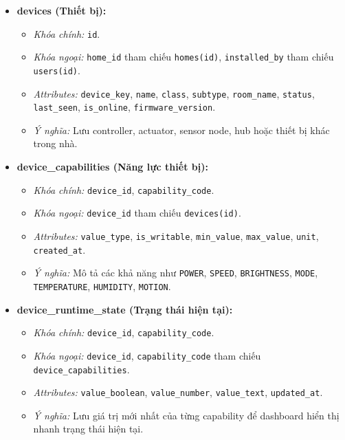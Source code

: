 \begin{itemize}
    \item \textbf{devices (Thiết bị):}
    \begin{itemize}
        \item \textit{Khóa chính:} \texttt{id}.
        \item \textit{Khóa ngoại:} \texttt{home\_id} tham chiếu \texttt{homes(id)}, \texttt{installed\_by} tham chiếu \texttt{users(id)}.
        \item \textit{Attributes:} \texttt{device\_key}, \texttt{name}, \texttt{class}, \texttt{subtype}, \texttt{room\_name}, \texttt{status}, \texttt{last\_seen}, \texttt{is\_online}, \texttt{firmware\_version}.
        \item \textit{Ý nghĩa:} Lưu controller, actuator, sensor node, hub hoặc thiết bị khác trong nhà.
    \end{itemize}

    \item \textbf{device\_capabilities (Năng lực thiết bị):}
    \begin{itemize}
        \item \textit{Khóa chính:} \texttt{device\_id}, \texttt{capability\_code}.
        \item \textit{Khóa ngoại:} \texttt{device\_id} tham chiếu \texttt{devices(id)}.
        \item \textit{Attributes:} \texttt{value\_type}, \texttt{is\_writable}, \texttt{min\_value}, \texttt{max\_value}, \texttt{unit}, \texttt{created\_at}.
        \item \textit{Ý nghĩa:} Mô tả các khả năng như \texttt{POWER}, \texttt{SPEED}, \texttt{BRIGHTNESS}, \texttt{MODE}, \texttt{TEMPERATURE}, \texttt{HUMIDITY}, \texttt{MOTION}.
    \end{itemize}

    \item \textbf{device\_runtime\_state (Trạng thái hiện tại):}
    \begin{itemize}
        \item \textit{Khóa chính:} \texttt{device\_id}, \texttt{capability\_code}.
        \item \textit{Khóa ngoại:} \texttt{device\_id}, \texttt{capability\_code} tham chiếu \texttt{device\_capabilities}.
        \item \textit{Attributes:} \texttt{value\_boolean}, \texttt{value\_number}, \texttt{value\_text}, \texttt{updated\_at}.
        \item \textit{Ý nghĩa:} Lưu giá trị mới nhất của từng capability để dashboard hiển thị nhanh trạng thái hiện tại.
    \end{itemize}


\end{itemize}
